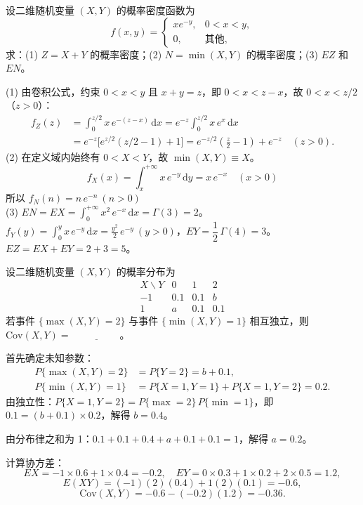 ﻿\documentclass[lang=cn,11pt]{elegantbook}
\begin{document}
\begin{exercise}\label{exer:4-joint-xey}
设二维随机变量 \((X,Y)\) 的概率密度函数为
\[
f(x,y) = \begin{cases} xe^{-y}, & 0 < x < y, \\ 0, & \text{其他}, \end{cases}
\]
求：(1) \(Z = X + Y\) 的概率密度；(2) \(N = \min(X,Y)\) 的概率密度；(3) \(EZ\) 和 \(EN\)。
\end{exercise}
\begin{solution}
(1) 由卷积公式，约束 \(0 < x < y\) 且 \(x + y = z\)，即 \(0 < x < z - x\)，故 \(0 < x < z/2\)（\(z > 0\)）：
\begin{align*}
f_Z(z) &= \int_0^{z/2} x\,e^{-(z-x)}\,\mathrm{d}x= e^{-z}\!\int_0^{z/2} x\,e^x\,\mathrm{d}x\\
&= e^{-z}\bigl[e^{z/2}(z/2 - 1) + 1\bigr]= e^{-z/2}\!\left(\frac{z}{2}-1\right) + e^{-z}\quad(z>0).
\end{align*}
(2) 在定义域内始终有 \(0 < X < Y\)，故 \(\min(X,Y) \equiv X\)。
\[f_X(x) = \displaystyle\int_x^{+\infty} x\,e^{-y}\,\mathrm{d}y = x\,e^{-x}\quad(x > 0)\]
所以 \(f_N(n) = n\,e^{-n}\ (n > 0)\)\\
(3) \(EN = EX = \displaystyle\int_0^{+\infty} x^2\,e^{-x}\,\mathrm{d}x = \Gamma(3) = 2\)。\\
\(f_Y(y) = \displaystyle\int_0^y x\,e^{-y}\,\mathrm{d}x = \frac{y^2}{2}\,e^{-y}\ (y > 0)\)，\(EY = \dfrac{1}{2}\,\Gamma(4) = 3\)。\\
\(EZ = EX + EY = 2 + 3 = 5\)。
\end{solution}


\begin{exercise}\label{exer:4-s3-maxmin}
设二维随机变量 \((X,Y)\) 的概率分布为
\[
\begin{array}{c|ccc}
X \backslash Y & 0 & 1 & 2 \\
\hline
-1 & 0.1 & 0.1 & b \\
1 & a & 0.1 & 0.1
\end{array}
\]
若事件 \(\{\max(X,Y)=2\}\) 与事件 \(\{\min(X,Y)=1\}\) 相互独立，则 \(\mathrm{Cov}(X,Y) =\,\underline{\hspace{2cm}}\)。
\end{exercise}

\begin{solution}
首先确定未知参数：
\begin{align*}
P\{\max(X,Y)=2\} &= P\{Y=2\} = b + 0.1,\\
P\{\min(X,Y)=1\} &= P\{X=1,Y=1\} + P\{X=1,Y=2\} = 0.2.
\end{align*}
由独立性：\(P\{X=1,Y=2\} = P\{\max=2\}\,P\{\min=1\}\)，即 \(0.1 = (b+0.1) \times 0.2\)，解得 \(b = 0.4\)。

由分布律之和为 1：\(0.1+0.1+0.4+a+0.1+0.1 = 1\)，解得 \(a = 0.2\)。

计算协方差：
\[
EX = -1 \times 0.6 + 1 \times 0.4 = -0.2,\quad EY = 0 \times 0.3 + 1 \times 0.2 + 2 \times 0.5 = 1.2,
\]
\[
E(XY) = (-1)(2)(0.4) + 1(2)(0.1) = -0.6,
\]
\[
\mathrm{Cov}(X,Y) = -0.6 - (-0.2)(1.2) = -0.36.
\]
\end{solution}
\end{document}
